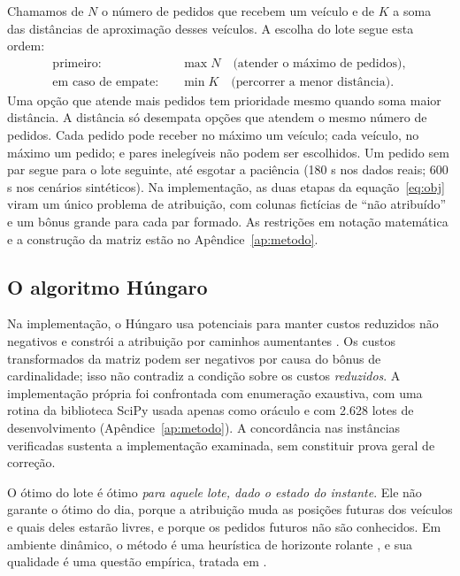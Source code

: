 Chamamos de $N$ o número de pedidos que recebem um veículo e de $K$ a soma das distâncias de aproximação desses veículos. A escolha do lote segue esta ordem:
\begin{equation}
\begin{aligned}
\text{primeiro:}\quad & \max N \quad\text{(atender o máximo de pedidos)},\\
\text{em caso de empate:}\quad & \min K \quad\text{(percorrer a menor distância)}.
\end{aligned}
\label{eq:obj}
\end{equation}
Uma opção que atende mais pedidos tem prioridade mesmo quando soma maior distância. A distância só desempata opções que atendem o mesmo número de pedidos. Cada pedido pode receber no máximo um veículo; cada veículo, no máximo um pedido; e pares inelegíveis não podem ser escolhidos. Um pedido sem par segue para o lote seguinte, até esgotar a paciência (180 s nos dados reais; 600 s nos cenários sintéticos). Na implementação, as duas etapas da equação~\ref{eq:obj} viram um único problema de atribuição, com colunas fictícias de \enquote{não atribuído} e um bônus grande para cada par formado. As restrições em notação matemática e a construção da matriz estão no Apêndice~\ref{ap:metodo}.

\subsection{O algoritmo Húngaro}

Na implementação, o Húngaro usa potenciais para manter custos reduzidos não negativos e constrói a atribuição por caminhos aumentantes \cite{kuhn1955, munkres1957, tomizawa1971, edmondskarp1972}. Os custos transformados da matriz podem ser negativos por causa do bônus de cardinalidade; isso não contradiz a condição sobre os custos \emph{reduzidos}. A implementação própria foi confrontada com enumeração exaustiva, com uma rotina da biblioteca SciPy usada apenas como oráculo \cite{jonker1987, crouse2016} e com 2.628 lotes de desenvolvimento (Apêndice~\ref{ap:metodo}). A concordância nas instâncias verificadas sustenta a implementação examinada, sem constituir prova geral de correção.

O ótimo do lote é ótimo \emph{para aquele lote, dado o estado do instante}. Ele não garante o ótimo do dia, porque a atribuição muda as posições futuras dos veículos e quais deles estarão livres, e porque os pedidos futuros não são conhecidos. Em ambiente dinâmico, o método é uma heurística de horizonte rolante \cite{pillac2013}, e sua qualidade é uma questão empírica, tratada em .

